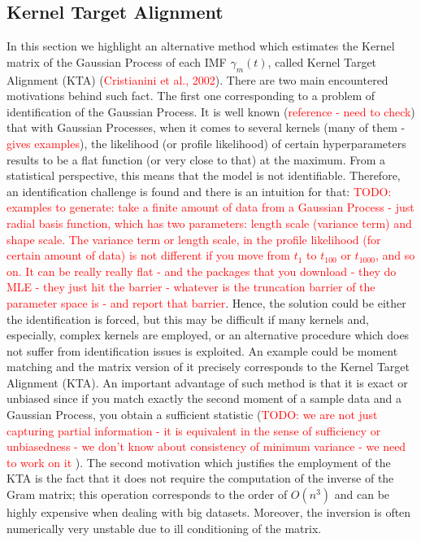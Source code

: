 \subsection{Kernel Target Alignment}

In this section we highlight an alternative method which estimates the Kernel matrix of the Gaussian Process of each IMF $\gamma_m(t)$, called Kernel Target Alignment (KTA) (\textcolor{red}{Cristianini et al., 2002}). There are two main encountered motivations behind such fact. The first one corresponding to a problem of identification of the Gaussian Process. It is well known (\textcolor{red}{reference - need to check}) that with Gaussian Processes, when it comes to several kernels (many of them - \textcolor{red}{gives examples}), the likelihood (or profile likelihood) of certain hyperparameters results to be a flat function (or very close to that) at the maximum. From a statistical perspective, this means that the model is not identifiable. Therefore, an identification challenge is found and there is an intuition for that: \textcolor{red}{TODO: examples to generate: take a finite amount of data from a Gaussian Process - just radial basis function, which has two parameters: length scale (variance term) and shape scale. The variance term or length scale, in the profile likelihood (for certain amount of data) is not different if you move from $t_1$ to $t_100$ or $t_1000$, and so on. It can be really really flat - and the packages that you download - they do MLE - they just hit the barrier - whatever is the truncation barrier of the parameter space is - and report that barrier}. Hence, the solution could be either the identification is forced, but this may be difficult if many kernels and, especially, complex kernels are employed, or an alternative procedure which does not suffer from identification issues is exploited. An example could be moment matching and the matrix version of it precisely corresponds to the Kernel Target Alignment (KTA). An important advantage of such method is that it is exact or unbiased since if you match exactly the second moment of a sample data and a Gaussian Process, you obtain a sufficient statistic (\textcolor{red}{TODO: we are not just capturing partial information - it is equivalent in the sense of sufficiency or unbiasedness - we don't know about consistency of minimum variance - we need to work on it }). The second motivation which justifies the employment of the KTA is the fact that it does not require the computation of the inverse of the Gram matrix; this operation corresponds to the order of $O(n^3)$ and can be highly expensive when dealing with big datasets. Moreover, the inversion is often numerically very unstable due to ill conditioning of the matrix.\\
